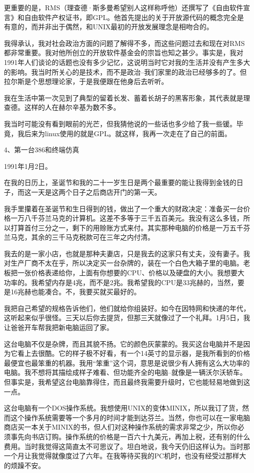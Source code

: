 更重要的是，RMS（理查德·斯多曼希望别人这样称呼他）还撰写了《自由软件宣言》和自由软件产权证书，即GPL。他首先提出的关于开放源代码的概念完全是有意的，而并非出于偶然，和UNIX最初的开放发展理念是相吻合的。

我得承认，我对社会政治方面的问题了解得不多，而这些问题过去和现在对RMS都非常重要。我对他所创立的开放软件基金会的宗旨也知之甚少。事实是，我对1991年人们谈论的话题也没有多少记忆，这说明当时它对我的生活并没有产生多大的影响。我当时所关心的是技术，而不是政治--我们家里的政治已经够多的了。但拉尔斯是个思想理论家，于是我便跟在他身后去听听。

我在生活中第一次见到了典型的留着长发、蓄着长胡子的黑客形象，其代表就是理查德。这样的人在赫尔辛基为数不多。

我当时可能没有看到眼前的光芒，但我猜他说的一些话也多少给了我一些锾。毕竟，我后来为linux使用的就是GPL。就这样，我再一次走在了自己的前面。

 
4、第一台386和终端仿真

1991年1月2日。

在我的日历上，圣诞节和我的二十一岁生日是两个最重要的能让我得到金钱的日子，而这一天是这两个日子之后商店开门的第一天。

我手里攥着在圣诞节和生日得到的钱，做出了一个重大的财政决定：准备买一台价格一万八千芬兰马克的计算机。这差不多等于三千五百美元。我没有这么多钱，所以打算首付三分之一，剩下的用赊账方式来付。其实那种电脑的价格是一万五千芬兰马克，其余的三千马克税款可在三年之内付清。

我去的是一家小店，也就是那种夫妻店，只是我去的这家只有丈夫，没有妻子。我对生产厂商不太在乎，所以决定买一台杂牌的，装在一个白色大箱子里的电脑。老板把一张价格表递给你，上面有你想要的CPU、价格以及硬盘的大小。我想要大功率的。我希望内存是4兆，而不是2兆。我希望我的CPU是33兆赫的，当然，要是16兆赫也能凑合。不，我要买就买最好的。

我把自己希望的规格告诉他们，他们就给你组装好。如今在因特网和快递的年代，这听起来似乎很怪。三天以后你去提货，但那三天就像过了一个礼拜。1月5日，我让爸爸开车帮我把新电脑运回了家。

这台电脑不仅是杂牌，而且其貌不扬。它的颜色灰蒙蒙的。我买这台电脑并不是因为它看上去很酷。它的样子极不好看，有一个14英寸的显示器，是我所看到的价格最便宜也最笨重的机器。我用“笨重”这个词，意思是说很少有人拥有这么大功率的电脑。我不想将其描绘成样子难看、但功能齐全的电脑--就像是一辆沃尔沃轿车。但事实是，我希望这台电脑靠得住，而且最终我需要升级时，它也能轻易地做到这一点。

这台电脑有一个DOS操作系统。我想使用UNIX的变体MINIX，所以我订了货，然而这个操作系统需要等一个多月的时间才能到达芬兰。当然，你也可以在一家电脑商店买一本关于MINIX的书，但人们对这种操作系统的需求非常之少，所以你必须事先向书店订购。操作系统的价格是一百六十九美元，再加上税，还有别的什么费用。当时我觉得这简直太不可思议了。坦白地说，我今天仍旧这样认为。当时那一个月让我觉得就像度过了六年。在我等待买我的PC机时，也没有经受过那样大的烦躁不安。

